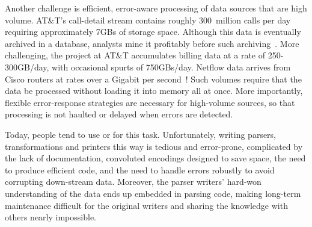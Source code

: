 Another challenge is efficient, error-aware processing of 
data sources that are high volume.  AT\&T's call-detail stream contains roughly 300~million
calls per day requiring approximately 7GBs of storage space.  Although
this data is eventually archived in a database, analysts mine it
profitably before such archiving~\cite{kdd98,kdd99}.  More
challenging, the \ningaui{} project at AT\&T accumulates billing data
at a rate of 250-300GB/day, with occasional spurts of 750GBs/day.
Netflow data arrives from Cisco routers at rates over a Gigabit per
second~\cite{gigascope}!  Such volumes require that the data be
processed without loading it into memory all at once.  More
importantly, flexible error-response strategies are necessary for
high-volume sources, so that processing is not haulted or delayed when
errors are detected.


Today, people tend to use \C{} or \perl{} for this task.
Unfortunately, writing parsers, transformations and printers this way
is tedious and error-prone, complicated by the lack of documentation,
convoluted encodings designed to save space, the need to produce
efficient code, and the need to handle errors robustly to avoid
corrupting down-stream data.  Moreover, the parser writers' hard-won
understanding of the data ends up embedded in parsing code, making
long-term maintenance difficult for the original writers and sharing
the knowledge with others nearly impossible.



